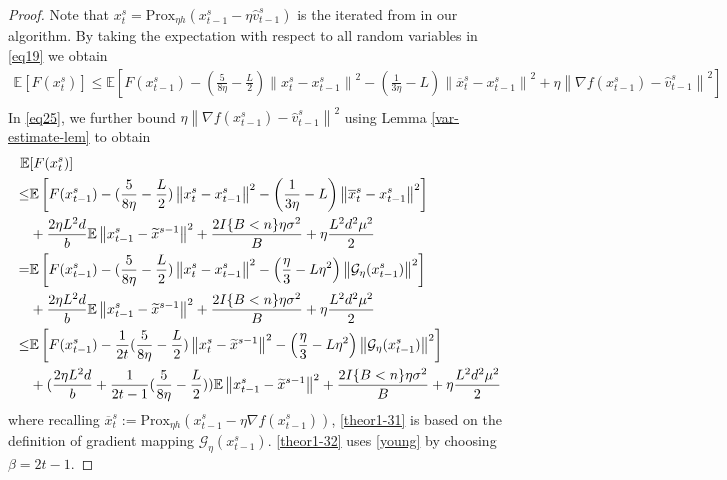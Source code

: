 \documentclass{article}
\newcommand*{\G}{\mathcal{G}}
\newcommand*{\Po}{\text{Prox}}
\newcommand*{\E}{\mathbb{E}}
\newcommand{\norm}[1]{\left\lVert#1\right\rVert}
\theoremstyle{definition}
\theoremstyle{remark}
\begin{document}
\begin{proof}
Note that $x_t^s = \Po_{\eta h}(x_{t-1}^s - \eta \hat{v}_{t-1}^s)$ is the iterated from in our algorithm.  By taking the expectation with respect to all random variables in \eqref{eq19} we obtain
 \begin{equation}\label{eq25}
 \begin{split} 
\E[F({x}_{t}^s)] \leq \E\left[F({x}_{t-1}^s)  -(\frac{5}{8\eta} - \frac{L}{2})\norm{{x}_t^s-x_{t-1}^s}^2- \left(\frac{1}{3\eta}-L\right)\norm{\overline{x}_t^s-x_{t-1}^s}^2+\eta \norm{\nabla f(x_{t-1}^s)-\hat{v}_{t-1}^s}^2\right]\\
 \end{split}
 \end{equation}
In \eqref{eq25}, we further bound $\eta \norm{\nabla f(x_{t-1}^s)-\hat{v}_{t-1}^s}^2$ using Lemma \ref{var-estimate-lem} to obtain
 \begin{align} 
\E&[F({x}_{t}^s)] \notag
\notag
\\ \leq& \E\left[F({x}_{t-1}^s)  -(\frac{5}{8\eta} - \frac{L}{2})\norm{{x}_t^s-x_{t-1}^s}^2- \left(\frac{1}{3\eta}-L\right)\norm{\overline{x}_t^s-x_{t-1}^s}^2\right]\notag\\
&+ \frac{2\eta L^2 d}{b}\E\norm{x_{t-1}^s-\widetilde{x}^{s-1}}^2 + \frac{2I\{B < n\}\eta \sigma ^2}{B}+\eta \frac{L^2 d^2 \mu^2}{2}\notag
\\ =& \E\left[F({x}_{t-1}^s)  -(\frac{5}{8\eta} - \frac{L}{2})\norm{{x}_t^s-x_{t-1}^s}^2- \left(\frac{\eta}{3}-L\eta^2\right)\norm{\G_{\eta}(x_{t-1}^s)}^2\right]\notag
\\&+\frac{2\eta L^2 d}{b}\E\norm{x_{t-1}^s-\widetilde{x}^{s-1}}^2+ \frac{2I\{B < n\}\eta \sigma ^2}{B}+\eta \frac{L^2 d^2 \mu^2}{2}\label{theor1-31}
\\ \leq& \E\left[F({x}_{t-1}^s)  -\frac{1}{2t}(\frac{5}{8\eta} - \frac{L}{2})\norm{{x}_t^s-\widetilde{x}^{s-1}}^2- \left(\frac{\eta}{3}-L\eta^2\right)\norm{\G_{\eta}(x_{t-1}^s)}^2\right]\notag\\
&+(\frac{2\eta L^2 d}{b}+\frac{1}{2t-1}(\frac{5}{8\eta} - \frac{L}{2}))\E\norm{x_{t-1}^s-\widetilde{x}^{s-1}}^2
+ \frac{2I\{B < n\}\eta \sigma ^2}{B}+\eta \frac{L^2 d^2 \mu^2}{2}\label{theor1-32}
 \end{align}
where recalling $\overline{x}_t^s := \Po_{\eta h}(x_{t-1}^s - \eta \nabla f(x_{t-1}^s))$, \eqref{theor1-31}  is based on the definition of gradient mapping $\G_{\eta}(x_{t-1}^s)$. \eqref{theor1-32} uses \eqref{young} by choosing $\beta = 2t-1$.
 

\end{proof}
\end{document}
